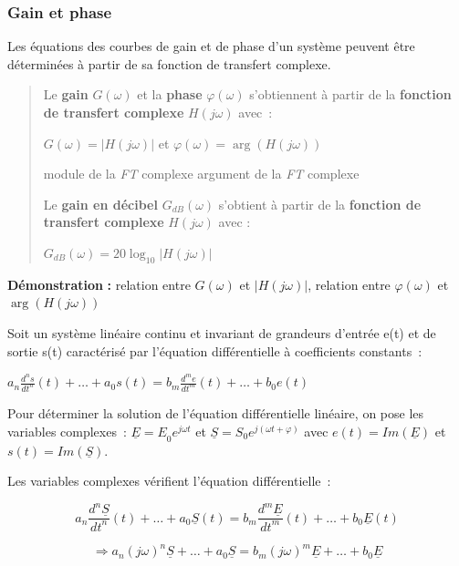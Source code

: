 \hypertarget{mod-gain-et-phase}{%
\subsubsection{Gain et phase}\label{mod-gain-et-phase}}

\TLBodePremierOrdre[1][1]


Les équations des courbes de gain et de phase d'un système peuvent être déterminées à partir de sa fonction de transfert complexe.

\begin{quote}
Le \textbf{gain} \(G(\omega)\) et la \textbf{phase} \(\varphi(\omega)\) s'obtiennent à partir de la \textbf{fonction de transfert complexe} \(H(j\omega)\) avec~:

\(G(\omega) = \left| H(j\omega) \right|\) et \(\varphi(\omega) = \arg\left( H(j\omega) \right)\)

module de la \emph{FT} complexe argument de la \emph{FT} complexe

Le \textbf{gain en décibel} \(G_{dB}(\omega)\) s'obtient à partir de la \textbf{fonction de transfert complexe} \(H(j\omega)\) avec :

\(G_{dB}(\omega) = 20\log_{10}\left| H(j\omega) \right|\)
\end{quote}

\textbf{Démonstration} \textbf{:} relation entre \(G(\omega)\) et \(\left| H(j\omega) \right|\), relation entre \(\varphi(\omega)\) et \(\arg\left( H(j\omega) \right)\)

Soit un système linéaire continu et invariant de grandeurs d'entrée e(t) et de sortie s(t) caractérisé par l'équation différentielle à coefficients constants~:

\(a_{n}\frac{d^{n}s}{{dt}^{n}}(t) + \ldots + a_{0}s(t) = b_{m}\frac{d^{m}e}{{dt}^{m}}(t) + \ldots + b_{0}e(t)\)

Pour déterminer la solution de l'équation différentielle linéaire, on pose les variables complexes~: \({\underline{E} = E}_{0}e^{j\omega t}\) et \(\underline{S} = S_{0}e^{j(\omega t + \varphi)}\) avec \(e(t) = Im(\underline{E})\) et \(s(t) = Im(\underline{S})\).

Les variables complexes vérifient l'équation différentielle~:

\[a_{n}\frac{d^{n}\underline{S}}{{dt}^{n}}(t) + \ldots + a_{0}\underline{S}(t) = b_{m}\frac{d^{m}\underline{E}}{{dt}^{m}}(t) + \ldots + b_{0}\underline{E}(t)\]

\[{\Longrightarrow a}_{n}(j\omega)^{n}\underline{S} + \ldots + a_{0}\underline{S} = b_{m}(j\omega)^{m}\underline{E} + \ldots + b_{0}\underline{E}\]

